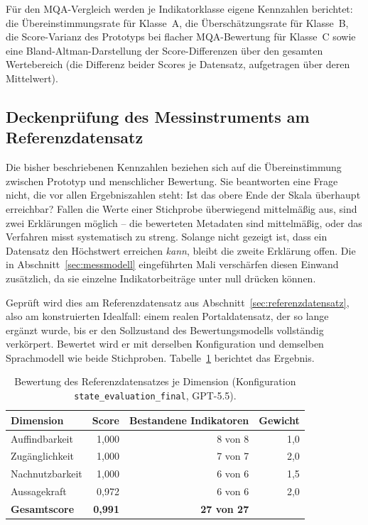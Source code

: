 Für den MQA-Vergleich werden je Indikatorklasse eigene Kennzahlen berichtet: die
Übereinstimmungsrate für Klasse~A, die Überschätzungsrate für Klasse~B, die
Score-Varianz des Prototyps bei flacher MQA-Bewertung für Klasse~C sowie eine
Bland-Altman-Darstellung der Score-Differenzen über den gesamten Wertebereich (die
Differenz beider Scores je Datensatz, aufgetragen über deren Mittelwert).

\subsection{Deckenprüfung des Messinstruments am Referenzdatensatz}
\label{subsec:deckenpruefung}

Die bisher beschriebenen Kennzahlen beziehen sich auf die Übereinstimmung zwischen
Prototyp und menschlicher Bewertung. Sie beantworten eine Frage nicht, die vor allen
Ergebniszahlen steht: Ist das obere Ende der Skala überhaupt erreichbar? Fallen die
Werte einer Stichprobe überwiegend mittelmäßig aus, sind zwei Erklärungen möglich --
die bewerteten Metadaten sind mittelmäßig, oder das Verfahren misst systematisch zu
streng. Solange nicht gezeigt ist, dass ein Datensatz den Höchstwert erreichen
\emph{kann}, bleibt die zweite Erklärung offen. Die in Abschnitt~\ref{sec:messmodell}
eingeführten Mali verschärfen diesen Einwand zusätzlich, da sie einzelne
Indikatorbeiträge unter null drücken können.

Geprüft wird dies am Referenzdatensatz aus Abschnitt~\ref{sec:referenzdatensatz}, also
am konstruierten Idealfall: einem realen Portaldatensatz, der so lange ergänzt wurde,
bis er den Sollzustand des Bewertungsmodells vollständig verkörpert. Bewertet wird er
mit derselben Konfiguration und demselben Sprachmodell wie beide Stichproben.
Tabelle~\ref{tab:deckenpruefung} berichtet das Ergebnis.

\begin{table}[H]
    \centering
    \scriptsize
    \renewcommand{\arraystretch}{1.2}
    \begin{tabular}{lrrr}
    \hline
    \textbf{Dimension} & \textbf{Score} & \textbf{Bestandene Indikatoren} & \textbf{Gewicht} \\
    \hline
    Auffindbarkeit & 1,000 & 8 von 8 & 1,0 \\
    Zugänglichkeit & 1,000 & 7 von 7 & 2,0 \\
    Nachnutzbarkeit & 1,000 & 6 von 6 & 1,5 \\
    Aussagekraft & 0,972 & 6 von 6 & 2,0 \\
    \hline
    \textbf{Gesamtscore} & \textbf{0,991} & \textbf{27 von 27} & \\
    \hline
    \end{tabular}
    \captionsetup{justification=centering}
    \caption[Deckenprüfung am Referenzdatensatz]{Bewertung des Referenzdatensatzes je
    Dimension (Konfiguration \texttt{state\_evaluation\_final},
    GPT-5.5).}
    \label{tab:deckenpruefung}
\end{table}

